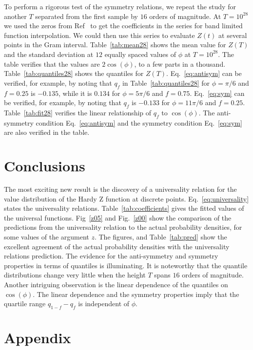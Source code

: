 \documentclass[twoside]{article}
\begin{document}
To perform a rigorous test of the symmetry relations, we repeat the study for another $T$ separated from the first sample by $16$ orders of magnitude. At $T=10^{28}$ we used the  zeros from Ref~\cite{hiary 2010} to get the coefficients in the series for band limited function interpolation. We could then use this series to evaluate  $Z(t)$  at several points in the Gram interval.
Table~\ref{tab:mean28} shows the mean value for $Z(T)$  and the standard deviation at $12$ equally spaced values of $\phi$ at $T=10^{28}$. The table verifies that the values are $2\cos(\phi)$, to a few parts in a thousand. Table~\ref{tab:quantiles28} shows the quantiles for $Z(T)$.  Eq.~\ref{eq:antisym} can be verified, for example, by noting that $q_f$ in Table~\ref{tab:quantiles28}
for $\phi=\pi/6$ and $f=0.25$ is $-0.135$, while it is $0.134$ for $\phi=5\pi/6$ and $f=0.75$. Eq.~\ref{eq:sym} can be verified, for example, by noting that $q_f$ is $-0.133$ for $\phi=11\pi/6$ and $f=0.25$. Table~\ref{tab:fit28} verifies the linear relationship of $q_f$ to $\cos(\phi)$. The anti-symmetry condition Eq.~\ref{eq:antisym}  and the symmetry condition Eq.~\ref{eq:sym} are also verified in the table.


\section{\label{conclusions}Conclusions}

The most exciting new result is the discovery of a universality relation for the 
value distribution of the Hardy Z function at discrete points. Eq.~\ref{eq:universality}
states the universality relations. Table~\ref{tab:coefficients} gives the fitted values 
of the universal functions.
Fig~\ref{z05} and Fig.~\ref{z00} show the comparison of the predictions from the universality 
relation to the actual probability densities, for some values of the argument $z$. The figures, and 
Table~\ref{tab:pred} show the excellent agreement of the actual probability densities with the
universality relations prediction.
The evidence for the anti-symmetry and symmetry properties 
in terms of quantiles is illuminating. 
It is noteworthy that the quantile distributions change very little 
when the height $T$ spans $16$ orders of magnitude. 
Another intriguing observation is the linear dependence of the quantiles 
on $\cos(\phi)$. The linear dependence and the symmetry properties imply that 
the quartile range $q_{1-f}-q_f$ is independent of $\phi$.

\section*{\label{appendix} Appendix}
\end{document}
